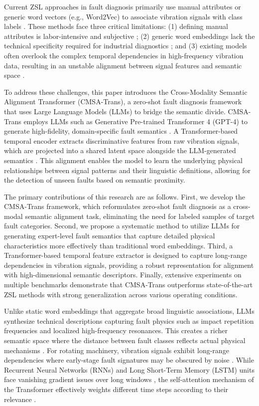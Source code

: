 \documentclass[journal]{IEEEtran}
\begin{document}
Current ZSL approaches in fault diagnosis primarily use manual attributes or generic word vectors (e.g., Word2Vec) to associate vibration signals with class labels \cite{lampert2014attribute}. These methods face three critical limitations: (1) defining manual attributes is labor-intensive and subjective \cite{fu2018zero}; (2) generic word embeddings lack the technical specificity required for industrial diagnostics \cite{mikolov2013efficient}; and (3) existing models often overlook the complex temporal dependencies in high-frequency vibration data, resulting in an unstable alignment between signal features and semantic space \cite{xian2018zero, buchert2020zero}.

To address these challenges, this paper introduces the Cross-Modality Semantic Alignment Transformer (CMSA-Trans), a zero-shot fault diagnosis framework that uses Large Language Models (LLMs) to bridge the semantic divide. CMSA-Trans employs LLMs such as Generative Pre-trained Transformer 4 (GPT-4) to generate high-fidelity, domain-specific fault semantics \cite{bubeck2023sparks, brown2020language}. A Transformer-based temporal encoder extracts discriminative features from raw vibration signals, which are projected into a shared latent space alongside the LLM-generated semantics \cite{vaswani2017attention, radford2021learning}. This alignment enables the model to learn the underlying physical relationships between signal patterns and their linguistic definitions, allowing for the detection of unseen faults based on semantic proximity.

The primary contributions of this research are as follows. First, we develop the CMSA-Trans framework, which reformulates zero-shot fault diagnosis as a cross-modal semantic alignment task, eliminating the need for labeled samples of target fault categories. Second, we propose a systematic method to utilize LLMs for generating expert-level fault semantics that capture detailed physical characteristics more effectively than traditional word embeddings. Third, a Transformer-based temporal feature extractor is designed to capture long-range dependencies in vibration signals, providing a robust representation for alignment with high-dimensional semantic descriptors. Finally, extensive experiments on multiple benchmarks demonstrate that CMSA-Trans outperforms state-of-the-art ZSL methods with strong generalization across various operating conditions.

Unlike static word embeddings that aggregate broad linguistic associations, LLMs synthesize technical descriptions capturing fault physics such as impact repetition frequencies and localized high-frequency resonances. This creates a richer semantic space where the distance between fault classes reflects actual physical mechanisms \cite{goodfellow2016deep, lecun2015deep}. For rotating machinery, vibration signals exhibit long-range dependencies where early-stage fault signatures may be obscured by noise \cite{zhang2021attention}. While Recurrent Neural Networks (RNNs) and Long Short-Term Memory (LSTM) units face vanishing gradient issues over long windows \cite{hochreiter1997long}, the self-attention mechanism of the Transformer effectively weights different time steps according to their relevance \cite{devlin2018bert, dosovitskiy2020image}.
\end{document}

